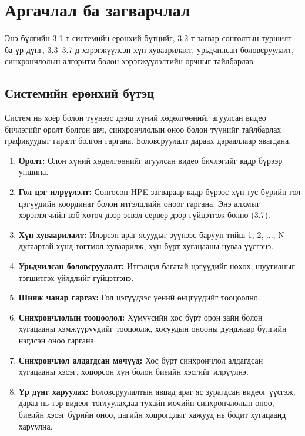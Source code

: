 \chapter{Аргачлал ба загварчлал}
Энэ бүлгийн 3.1-т системийн ерөнхий бүтцийг, 3.2-т загвар сонголтын туршилт ба үр дүнг, 3.3--3.7-д хэрэгжүүлсэн хүн хуваарилалт, урьдчилсан боловсруулалт, синхрончлолын алгоритм болон хэрэгжүүлэлтийн орчныг тайлбарлав.

\section{Системийн ерөнхий бүтэц}

Систем нь хоёр болон түүнээс дээш хүний хөдөлгөөнийг агуулсан видео бичлэгийг оролт болгон авч, синхрончлолын оноо болон түүнийг тайлбарлах графикуудыг гаралт болгон гаргана. Боловсруулалт дараах дарааллаар явагдана.

\begin{enumerate}
\def\labelenumi{\arabic{enumi}.}
\item
  \textbf{Оролт:} Олон хүний хөдөлгөөнийг агуулсан видео бичлэгийг кадр бүрээр уншина.
\item
  \textbf{Гол цэг илрүүлэлт:} Сонгосон HPE загвараар кадр бүрээс хүн тус бүрийн гол цэгүүдийн координат болон итгэлцлийн оноог гаргана. Энэ алхмыг хэрэглэгчийн вэб хөтөч дээр эсвэл сервер дээр гүйцэтгэж болно (3.7).
\item
  \textbf{Хүн хуваарилалт:} Илэрсэн араг ясуудыг зүүнээс баруун тийш 1, 2, ..., N дугаартай хүнд тогтмол хуваарилж, хүн бүрт хугацааны цуваа үүсгэнэ.
\item
  \textbf{Урьдчилсан боловсруулалт:} Итгэлцэл багатай цэгүүдийг нөхөх, шуугианыг тэгшитгэх үйлдлийг гүйцэтгэнэ.
\item
  \textbf{Шинж чанар гаргах:} Гол цэгүүдээс үений өнцгүүдийг тооцоолно.
\item
  \textbf{Синхрончлолын тооцоолол:} Хүмүүсийн хос бүрт орон зайн болон хугацааны хэмжүүрүүдийг тооцоолж, хосуудын онооны дунджаар бүлгийн нэгдсэн оноо гаргана.
\item
  \textbf{Синхрончлол алдагдсан мөчүүд:} Хос бүрт синхрончлол алдагдсан хугацааны хэсэг, хоцорсон хүн болон биеийн хэсгийг илрүүлнэ.
\item
  \textbf{Үр дүнг харуулах:} Боловсруулалтын явцад араг яс зурагдсан видеог үүсгэж, дараа нь тэр видеог тоглуулахдаа тухайн мөчийн синхрончлолын оноо, биеийн хэсэг бүрийн оноо, цагийн хоцрогдлыг хажууд нь бодит хугацаанд харуулна.
\end{enumerate}

